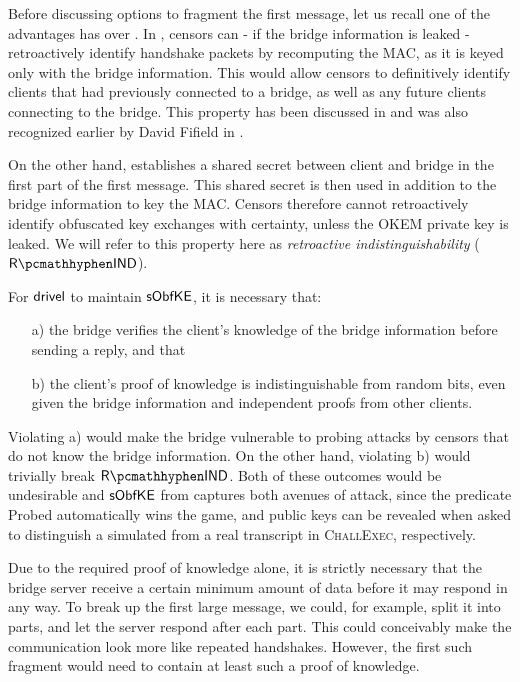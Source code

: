 Before discussing options to fragment the first message, let us recall one of the advantages \drivel{} has over \obfsfour{}. In \obfsfour{}, censors can - if the bridge information is leaked - retroactively identify handshake packets by recomputing the MAC, as it is keyed only with the bridge information. This would allow censors to definitively identify clients that had previously connected to a bridge, as well as any future clients connecting to the bridge. This property has been discussed in \cite[Section~6]{CCS:GunSteVei24} and was also recognized earlier by David Fifield in \cite{obfs4-pk-reveal-distinguisher}.

On the other hand, \drivel{} establishes a shared secret between client and bridge in the first part of the first message. This shared secret is then used in addition to the bridge information to key the MAC. Censors therefore cannot retroactively identify obfuscated key exchanges with certainty, unless the OKEM private key is leaked. We will refer to this property here as \emph{retroactive indistinguishability} ($\rind$).

For $\textsf{drivel}$ to maintain $\mathsf{sObfKE}$, it is necessary that:
\begin{itemize}
    \item[a)] the bridge verifies the client's knowledge of the bridge information before sending a reply, and that
    \item[b)] the client's proof of knowledge is indistinguishable from random bits, even given the bridge information and independent proofs from other clients.
\end{itemize}

Violating a) would make the bridge vulnerable to probing attacks by censors that do not know the bridge information. On the other hand, violating b) would trivially break $\rind$. Both of these outcomes would be undesirable and $\mathsf{sObfKE}$ from \cite{CCS:GunSteVei24} captures both avenues of attack, since the predicate \textsf{Probed} automatically wins the game, and public keys can be revealed when asked to distinguish a simulated from a real transcript in \textsc{ChallExec}, respectively.

Due to the required proof of knowledge alone, it is strictly necessary that the bridge server receive a certain minimum amount of data before it may respond in any way.
To break up the first large \drivel{} message, we could, for example, split it into parts, and let the server respond after each part. This could conceivably make the communication look more like repeated \obfsfour{} handshakes. However, the first such fragment would need to contain at least such a proof of knowledge.

